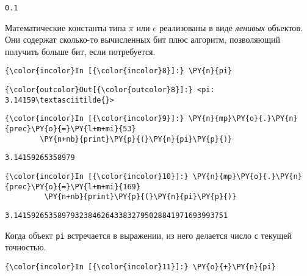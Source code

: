     \begin{Verbatim}[commandchars=\\\{\}]
0.1

    \end{Verbatim}

    Математические константы типа \(\pi\) или \(e\) реализованы в виде
\emph{ленивых} объектов. Они содержат сколько-то вычисленных бит плюс
алгоритм, позволяющий получить больше бит, если потребуется.

    \begin{Verbatim}[commandchars=\\\{\}]
{\color{incolor}In [{\color{incolor}8}]:} \PY{n}{pi}
\end{Verbatim}

            \begin{Verbatim}[commandchars=\\\{\}]
{\color{outcolor}Out[{\color{outcolor}8}]:} <pi: 3.14159\textasciitilde{}>
\end{Verbatim}
        
    \begin{Verbatim}[commandchars=\\\{\}]
{\color{incolor}In [{\color{incolor}9}]:} \PY{n}{mp}\PY{o}{.}\PY{n}{prec}\PY{o}{=}\PY{l+m+mi}{53}
        \PY{n+nb}{print}\PY{p}{(}\PY{n}{pi}\PY{p}{)}
\end{Verbatim}

    \begin{Verbatim}[commandchars=\\\{\}]
3.14159265358979

    \end{Verbatim}

    \begin{Verbatim}[commandchars=\\\{\}]
{\color{incolor}In [{\color{incolor}10}]:} \PY{n}{mp}\PY{o}{.}\PY{n}{prec}\PY{o}{=}\PY{l+m+mi}{169}
         \PY{n+nb}{print}\PY{p}{(}\PY{n}{pi}\PY{p}{)}
\end{Verbatim}

    \begin{Verbatim}[commandchars=\\\{\}]
3.1415926535897932384626433832795028841971693993751

    \end{Verbatim}

    Когда объект \texttt{pi} встречается в выражении, из него делается число
с текущей точностью.

    \begin{Verbatim}[commandchars=\\\{\}]
{\color{incolor}In [{\color{incolor}11}]:} \PY{o}{+}\PY{n}{pi}
\end{Verbatim}

